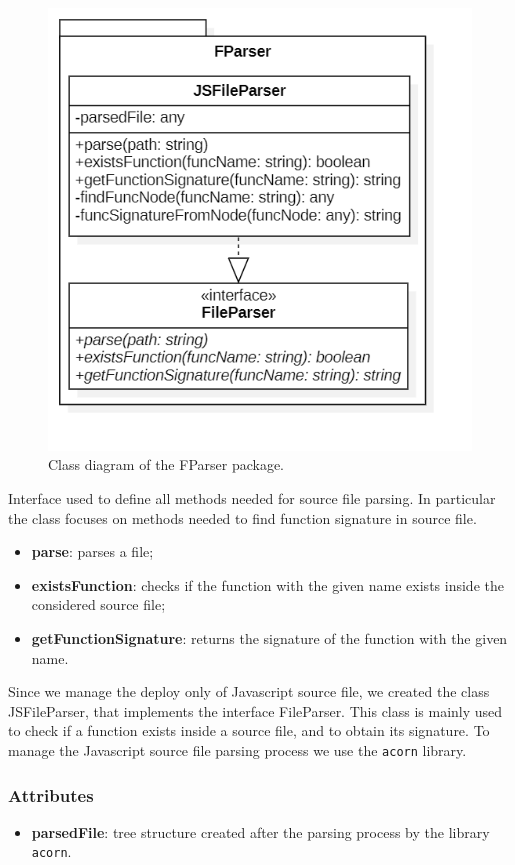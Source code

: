 		\begin{figure} [h!]
			\centering
			\includegraphics[width=0.5\linewidth]{diagrammi/etherless-cli/FParser}
			\caption{Class diagram of the FParser package.}
		\end{figure}
		
			Interface used to define all methods needed for source file parsing. In particular the class focuses on methods needed to find function signature in source file. 
		
					\begin{itemize}
						\item \textbf{parse}: parses a file;   
						\item \textbf{existsFunction}: checks if the function with the given name exists inside the considered source file;
						\item \textbf{getFunctionSignature}: returns the signature of the function with the given name.
					\end{itemize}
		
			Since we manage the deploy only of Javascript source file, we created the class JSFileParser, that implements the interface FileParser. This class is mainly used to check if a function exists inside a source file, and to obtain its signature. To manage the Javascript source file parsing process we use the \texttt{acorn} library. 
			
				\subsubsection*{Attributes}
					\begin{itemize}
						\item \textbf{parsedFile}: tree structure created after the parsing process by the library \texttt{acorn}.
					\end{itemize}
				
